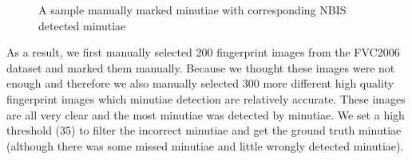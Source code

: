 \begin{figure}[htbp]
    \centering
    \quad
    \quad
    \caption{A sample manually marked minutiae with corresponding NBIS detected minutiae}
    \label{fig:label}
\end{figure}


As a result, we first manually selected 200 fingerprint images from the FVC2006 dataset \cite{FVC2006} and marked them manually.
Because we thought these images were not enough and therefore we also manually selected 300 more different high quality fingerprint images which minutiae detection are relatively accurate.
These images are all very clear and the most minutiae was detected by minutiae.
We set a high threshold (35) to filter the incorrect minutiae and get the ground truth minutiae (although there was some missed minutiae and little wrongly detected minutiae).

